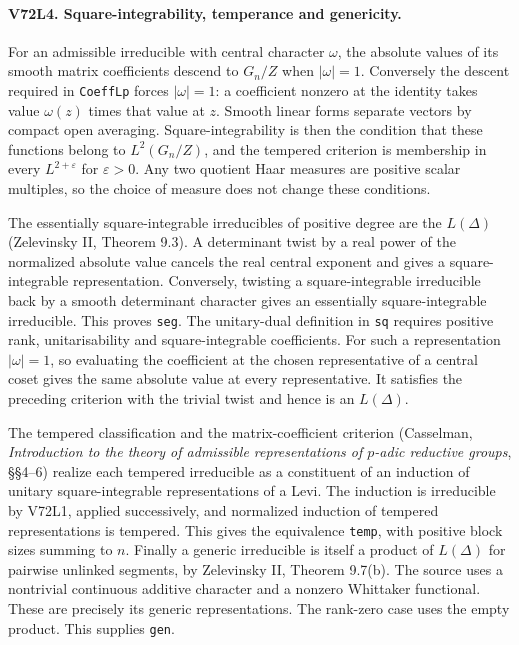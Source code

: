 \paragraph{V72L4. Square-integrability, temperance and genericity.}
For an admissible irreducible with central character $\omega$, the
absolute values of its smooth matrix coefficients descend to $G_n/Z$
when $|\omega|=1$. Conversely the descent required in
\texttt{CoeffLp} forces $|\omega|=1$: a coefficient nonzero at the
identity takes value $\omega(z)$ times that value at $z$. Smooth
linear forms separate vectors by compact open averaging.
Square-integrability is then the condition that these functions
belong to $L^2(G_n/Z)$, and the tempered criterion is membership
in every $L^{2+\varepsilon}$ for $\varepsilon>0$. Any two quotient
Haar measures are positive scalar multiples, so the choice of
measure does not change these conditions.

The essentially square-integrable irreducibles of positive degree
are the $L(\Delta)$ (Zelevinsky II, Theorem 9.3).
A determinant twist by a real power of the normalized absolute
value cancels the real central exponent and gives a square-integrable
representation. Conversely, twisting a square-integrable irreducible
back by a smooth determinant character gives an essentially
square-integrable irreducible. This proves \texttt{seg}. The
unitary-dual definition in \texttt{sq} requires positive rank,
unitarisability and square-integrable coefficients. For such a
representation $|\omega|=1$, so evaluating the coefficient at the
chosen representative of a central coset gives the same absolute
value at every representative. It satisfies the preceding criterion
with the trivial twist and hence is an $L(\Delta)$.

The tempered classification and the matrix-coefficient criterion
(Casselman, \emph{Introduction to the theory of admissible
representations of $p$-adic reductive groups}, \S\S4--6) realize
each tempered irreducible as a constituent of an induction of
unitary square-integrable representations of a Levi. The induction
is irreducible by V72L1, applied successively, and normalized
induction of tempered representations is tempered. This gives the
equivalence \texttt{temp}, with positive block sizes summing to $n$.
Finally a generic irreducible is itself a product of $L(\Delta)$
for pairwise unlinked segments, by Zelevinsky II, Theorem 9.7(b).
The source uses a nontrivial continuous additive character and a
nonzero Whittaker functional. These are precisely its generic
representations. The rank-zero case uses the empty product.
This supplies \texttt{gen}.


